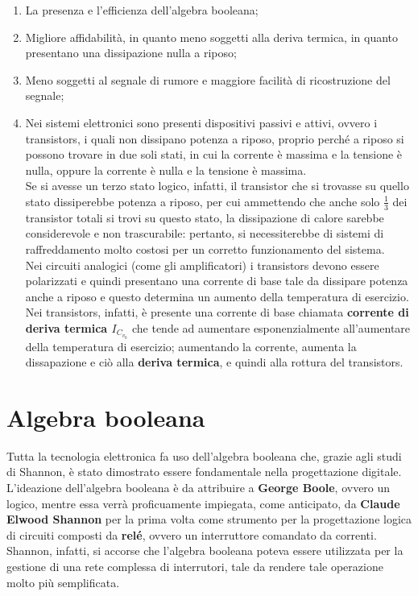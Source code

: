 \documentclass[a4paper]{extarticle}
\begin{document}
\begin{enumerate}
    \item La presenza e l'efficienza dell'algebra booleana;
    \item Migliore affidabilità, in quanto meno soggetti alla deriva termica, in quanto presentano una dissipazione nulla a riposo;
    \item Meno soggetti al segnale di rumore e maggiore facilità di ricostruzione del segnale;
    \item Nei sistemi elettronici sono presenti dispositivi passivi e attivi, ovvero i transistors, i quali non dissipano potenza a riposo, proprio perché a riposo si possono trovare in due soli stati, in cui la corrente è massima e la tensione è nulla, oppure la corrente è nulla e la tensione è massima.\\
    Se si avesse un terzo stato logico, infatti, il transistor che si trovasse su quello stato dissiperebbe potenza a riposo, per cui ammettendo che anche solo \(\frac{1}{3}\) dei transistor totali si trovi su questo stato, la dissipazione di calore sarebbe considerevole e non trascurabile: pertanto, si necessiterebbe di sistemi di raffreddamento molto costosi per un corretto funzionamento del sistema.\\
    Nei circuiti analogici (come gli amplificatori) i transistors devono essere polarizzati e quindi presentano una corrente di base tale da dissipare potenza anche a riposo e questo determina un aumento della temperatura di esercizio.\\
    Nei transistors, infatti, è presente una corrente di base chiamata \textbf{corrente di deriva termica \(I_{C_{v_{0}}}\)} che tende ad aumentare esponenzialmente all'aumentare della temperatura di esercizio; aumentando la corrente, aumenta la dissapazione e ciò alla \textbf{deriva termica}, e quindi alla rottura del transistors.
\end{enumerate}

\newpage
\section{Algebra booleana}
Tutta la tecnologia elettronica fa uso dell'algebra booleana che, grazie agli studi di Shannon, è stato dimostrato essere fondamentale nella progettazione digitale.\\
L'ideazione dell'algebra booleana è da attribuire a \textbf{George Boole}, ovvero un logico, mentre essa verrà proficuamente impiegata, come anticipato, da \textbf{Claude Elwood Shannon} per la prima volta come strumento per la progettazione logica di circuiti composti da \textbf{relé}, ovvero un interruttore comandato da correnti.\\
Shannon, infatti, si accorse che l'algebra booleana poteva essere utilizzata per la gestione di una rete complessa di interrutori, tale da rendere tale operazione molto più semplificata.
\end{document}
